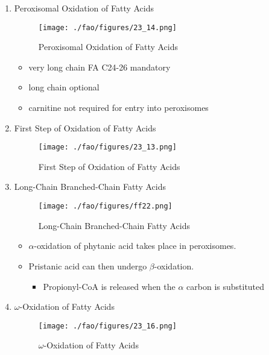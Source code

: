 \documentclass{scrartcl}
\begin{document}
\begin{enumerate}
\item Peroxisomal Oxidation of Fatty Acids
\label{sec:orgd57e0da}

\begin{figure}[htbp]
\centering
\texttt{[image: ./fao/figures/23\_14.png]}
\caption{\label{fig:orgbc71bcd}
Peroxisomal Oxidation of Fatty Acids}
\end{figure}

\begin{itemize}
\item very long chain FA C24-26 mandatory
\item long chain optional
\item carnitine not required for entry into peroxisomes
\end{itemize}

\item First Step of Oxidation of Fatty Acids
\label{sec:orgebb6fd6}
\begin{figure}[htbp]
\centering
\texttt{[image: ./fao/figures/23\_13.png]}
\caption{\label{fig:orgb5ef04c}
First Step of Oxidation of Fatty Acids}
\end{figure}

\item Long-Chain Branched-Chain Fatty Acids
\label{sec:orgf2f7fc9}

\begin{figure}[htbp]
\centering
\texttt{[image: ./fao/figures/ff22.png]}
\caption{\label{fig:org3c21430}
Long-Chain Branched-Chain Fatty Acids}
\end{figure}

\begin{itemize}
\item \(\alpha\)-oxidation of phytanic acid takes place in peroxisomes.
\item Pristanic acid can then undergo \(\beta\)-oxidation.
\begin{itemize}
\item Propionyl-CoA is released when the \(\alpha\) carbon is substituted
\end{itemize}
\end{itemize}

\item \(\omega\)-Oxidation of Fatty Acids
\label{sec:org7a34d0e}

\begin{figure}[htbp]
\centering
\texttt{[image: ./fao/figures/23\_16.png]}
\caption{\label{fig:orgad3fdd3}
\(\omega\)-Oxidation of Fatty Acids}
\end{figure}


\end{enumerate}
\end{document}
